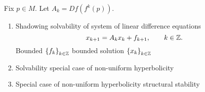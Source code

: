 Fix $p\in M.$ Let $A_k = Df( f^k(p) ).$

\begin{enumerate}
    \item \label{item:shadimplsolv}  Shadowing \imply solvability of system of linear difference equations
    $$
    x_{k+1} = A_k x_k + f_{k+1},\qquad k\in \mathbb Z.
      $$
      Bounded $\left\{ {f}_{k} \right\}_{k\in\mathbb Z}$ \imply bounded solution $\left\{ {x}_{k} \right\}_{k\in\mathbb Z}$
    \pause

    \item \label{item:solvimplhyp} Solvability \imply special case of non-uniform hyperbolicity \pause
    \item \label{item:hypimplstab} Special case of non-uniform hyperbolicity \imply structural stability
\end{enumerate}
%
